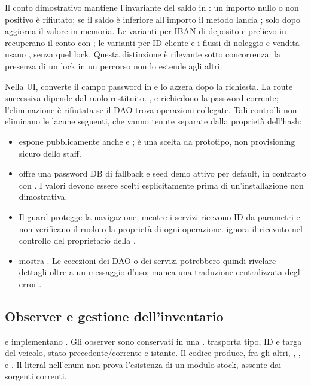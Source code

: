 Il conto dimostrativo mantiene l'invariante del saldo in : un importo nullo o non positivo è rifiutato; se il saldo è inferiore all'importo il metodo lancia ; solo dopo aggiorna il valore in memoria. Le varianti per IBAN di deposito e prelievo in  recuperano il conto con ; le varianti per ID cliente e i flussi di noleggio e vendita usano , senza quel lock. Questa distinzione è rilevante sotto concorrenza: la presenza di un lock in un percorso non lo estende agli altri.

Nella UI,  converte il campo password in  e lo azzera dopo la richiesta. La route successiva dipende dal ruolo restituito. ,  e  richiedono la password corrente; l'eliminazione è rifiutata se il DAO trova operazioni collegate. Tali controlli non eliminano le lacune seguenti, che vanno tenute separate dalla proprietà dell'hash:
\begin{itemize}
\item {} espone pubblicamente anche  e ; è una scelta da prototipo, non provisioning sicuro dello staff.
\item {} offre una password DB di fallback e seed demo attivo per default, in contrasto con . I valori devono essere scelti esplicitamente prima di un'installazione non dimostrativa.
\item Il guard  protegge la navigazione, mentre i servizi ricevono ID da parametri e non verificano il ruolo o la proprietà di ogni operazione.  ignora il  ricevuto nel controllo del proprietario della .
\item {} mostra . Le eccezioni dei DAO o dei servizi potrebbero quindi rivelare dettagli oltre a un messaggio d'uso; manca una traduzione centralizzata degli errori.
\end{itemize}

\subsection{Observer e gestione dell'inventario}\label{sec:observer}
 e  implementano . Gli observer sono conservati in una .  trasporta tipo, ID e targa del veicolo, stato precedente/corrente e istante. Il codice produce, fra gli altri, , ,  e . Il literal  nell'enum non prova l'esistenza di un modulo stock, assente dai sorgenti correnti.

